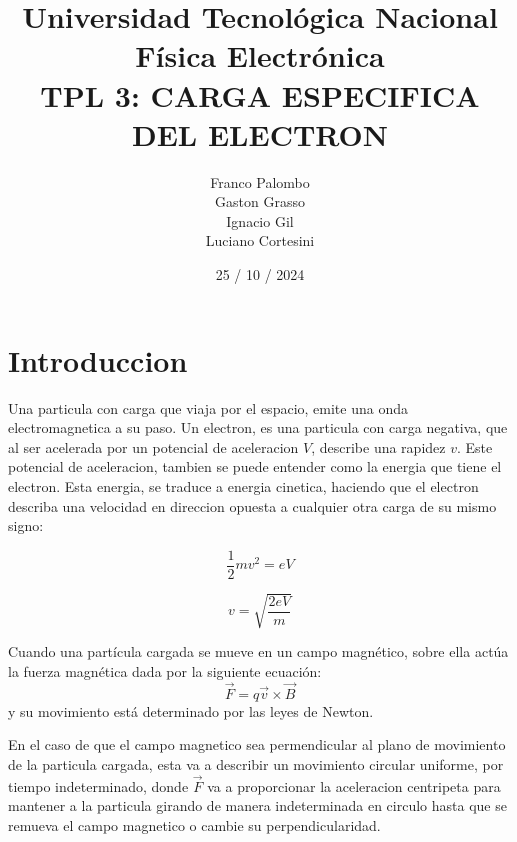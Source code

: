 \documentclass[a4paper,12pt]{report}
\title{
  \fontsize{25}{0}\selectfont Universidad Tecnológica Nacional\\
  \fontsize{22}{30}\selectfont Física Electrónica\\
  \fontsize{18}{25}\selectfont TPL 3: CARGA ESPECIFICA DEL ELECTRON\\
}
\author{
Franco Palombo\\
Gaston Grasso\\
Ignacio Gil\\
Luciano Cortesini\\
}
\date{25 / 10 / 2024}
\begin{document}
\maketitle

\chapter{Introduccion}

    Una particula con carga que viaja por el espacio, emite una onda electromagnetica a su paso. Un electron, es una
    particula con carga negativa, que al ser acelerada por un potencial de aceleracion $V$, describe una rapidez $v$.
    Este potencial de aceleracion, tambien se puede entender como la energia que tiene el electron. Esta energia, se
    traduce a energia cinetica, haciendo que el electron describa una velocidad en direccion opuesta a cualquier otra
    carga de su mismo signo:
    \begin{figure}[h!]
        \centering
        \begin{minipage}{0.3\textwidth}
            \begin{equation*}
                \frac{1}{2} m v^2 = eV
            \end{equation*}
        \end{minipage}
        \begin{minipage}{0.3\textwidth}
            \begin{equation}
                \label{v.electron}
                v = \sqrt{\frac{2 eV}{m}}
            \end{equation}
        \end{minipage}
    \end{figure}

    Cuando una partícula cargada se mueve en un campo magnético, sobre ella actúa la fuerza magnética dada por la
    siguiente ecuación:
    \begin{equation}
        \vec{F} = q \vec{v} \times \vec{B}
    \end{equation}
    y su movimiento está determinado por las leyes de Newton.

    En el caso de que el campo magnetico sea permendicular al plano de movimiento de la particula cargada, esta
    va a describir un movimiento circular uniforme, por tiempo indeterminado, donde $\vec{F}$ va a proporcionar la
    aceleracion centripeta para mantener a la particula girando de manera indeterminada en circulo hasta que se
    remueva el campo magnetico o cambie su perpendicularidad.
\end{document}
